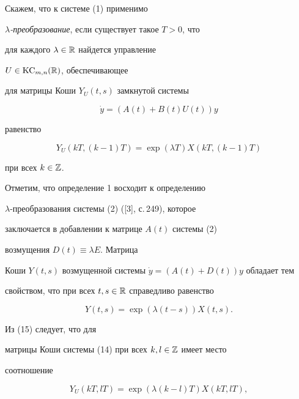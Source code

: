 \begin{defn} Скажем, что к системе (1) применимо


{\it $\lambda$-преобразование}, если существует такое $T>0$, что


для каждого $\lambda\in\Bbb R$ найдется управление


$U\in\operatorname{KC}_{m,n}(\Bbb R)$, обеспечивающее


для матрицы Коши $Y_{U}(t,s)$ замкнутой системы


\begin{equation}


\Dot y=(A(t)+B(t)U(t))y


\end{equation}


равенство


\begin{equation}


Y_{U}(kT,(k-1)T)=\exp(\lambda T)X(kT,(k-1)T)


\end{equation}


при всех $k\in\Bbb Z$.


\end{defn}





Отметим, что определение 1 восходит к определению


$\lambda$-преобразования системы (2) ([3], с.\,249), которое


заключается в добавлении к матрице $A(t)$ системы (2)


возмущения $D(t)\equiv\lambda E$. Матрица


Коши $Y(t,s)$ возмущенной системы $\Dot y=(A(t)+D(t))y$ обладает тем


свойством, что при всех $t,s\in\Bbb R$ справедливо равенство


\begin{equation}


Y(t,s)=\exp(\lambda(t-s))X(t,s).


\end{equation}


Из (15) следует, что для


матрицы Коши системы (14) при всех $k,l\in\Bbb Z$ имеет место


соотношение


\begin{equation}


Y_{U}(kT,lT)=\exp(\lambda (k-l)T)X(kT,lT),


\end{equation}


